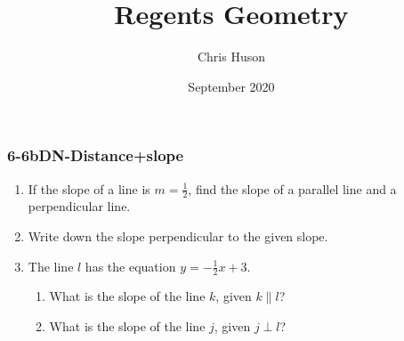 \documentclass[12pt, twoside]{article}
\title{Regents Geometry}
\author{Chris Huson}
\date{September 2020}
\begin{document}
\subsubsection*{6-6bDN-Distance+slope}
\begin{enumerate}
\item If the slope of a line is $m=\frac{1}{2}$, find the slope of a parallel line and a perpendicular line.
  \begin{enumerate}
  \end{enumerate} \vspace{1cm}
  
\item Write down the slope perpendicular to the given slope.
  \begin{enumerate}
  \end{enumerate} \vspace{1cm}

  
\item The line $l$ has the equation $y=-\frac{1}{2} x+3$.
  \begin{enumerate}
    \item What is the slope of the line $k$, given $k \parallel l$?
    \vspace{1.3cm}
    \item What is the slope of the line $j$, given $j \perp l$?
    \vspace{1.3cm}
  \end{enumerate}
   

\end{enumerate}
\end{document}
